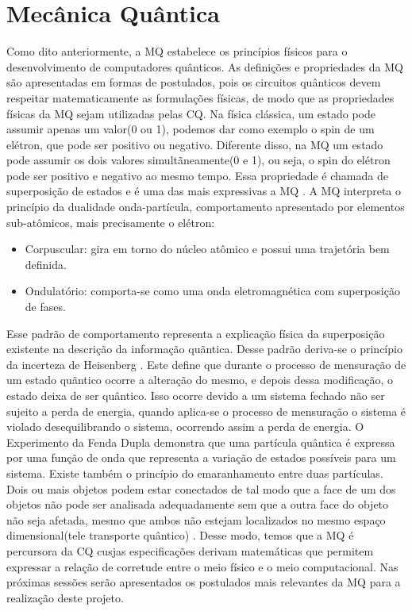 \documentclass[tcc,capa]{texufpel}
\begin{document}
\section{Mecânica Quântica}
Como dito anteriormente, a MQ estabelece os princípios físicos para o desenvolvimento de computadores quânticos. As definições e propriedades da MQ são apresentadas em formas de postulados, pois os circuitos quânticos devem respeitar matematicamente as formulações físicas, de modo que as propriedades físicas da MQ sejam utilizadas pelas CQ.
Na física clássica, um estado pode assumir apenas um valor(0 ou 1), podemos dar como exemplo o spin de um elétron, que pode ser positivo ou negativo. Diferente disso, na MQ um estado pode assumir os dois valores simultãneamente(0 e 1), ou seja, o spin do elétron pode ser positivo e negativo ao mesmo tempo. Essa propriedade é chamada de superposição de estados e é uma das mais expressivas a MQ \cite{MARON10}.
A MQ interpreta o princípio da dualidade onda-partícula, comportamento apresentado por elementos sub-atômicos, mais precisamente o elétron:
\begin{itemize}
    \item Corpuscular: gira em torno do núcleo atômico e possui uma trajetória bem definida.
    \item Ondulatório: comporta-se como uma onda eletromagnética com superposição de fases.
\end{itemize}
Esse padrão de comportamento representa a explicação física da superposição existente na descrição da informação quãntica. Desse padrão deriva-se o princípio da incerteza de Heisenberg \cite{courteille2014mecanica}. Este define que durante o processo de mensuração de um estado quãntico ocorre a alteração do mesmo, e depois dessa modificação, o estado deixa de ser quântico. Isso ocorre devido a um sistema fechado não ser sujeito a perda de energia, quando aplica-se o processo de mensuração o sistema é violado desequilibrando o sistema, ocorrendo assim a perda de energia. O Experimento da Fenda Dupla demonstra que uma partícula quântica é expressa por uma função de onda que representa a variação de estados possíveis para um sistema.
Existe também o princípio do emaranhamento entre duas partículas. Dois ou mais objetos podem estar conectados de tal modo que a face de um dos objetos não pode ser analisada adequadamente sem que a outra face do objeto não seja afetada, mesmo que ambos não estejam localizados no mesmo espaço dimensional(tele transporte quântico) \cite{chuang00a}. 
Desse modo, temos que a MQ é percursora da CQ cusjas especificações derivam matemáticas que permitem expressar a relação de corretude entre o meio físico e o meio computacional. Nas próximas sessões serão apresentados os postulados mais relevantes da MQ para a realização deste projeto.
\end{document}
